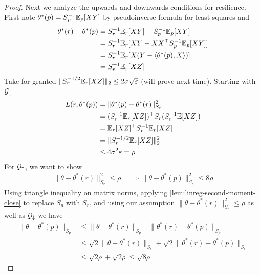 \begin{proof}
  Next we analyze the upwards and downwards conditions for resilience.
  First note $\theta^*(p) = S_p^{-1} \mathbb{E}_p[ X Y]$ by pseudoinverse formula
  for least squares and
  \begin{align}
    \theta^*(r) - \theta^*(p)
    &= S_r^{-1} \mathbb{E}_r[X Y] - S_p^{-1} \mathbb{E}_p[ X Y] \\
    &= S_r^{-1} \mathbb{E}_r[X Y - X X^\top S_p^{-1} \mathbb{E}_p[X Y]] \\
    &= S_r^{-1} \mathbb{E}_r[X (Y - \braket{\theta^*(p), X})] \\
    &= S_r^{-1} \mathbb{E}_r[X Z] \label{eq:linreg-second-moment-diff-theta-star}
  \end{align}
  Take for granted $\| S_r^{-1/2} \mathbb{E}_r[X Z]\|_2 \leq 2 \sigma \sqrt{\varepsilon}$
  (will prove next time).
  Starting with $\mathcal{G}_{\downarrow}$
  \begin{align}
    L(r, \theta^*(p))
    &= \|\theta^*(p) - \theta^*(r)\|_{S_r}^2 \\
    &= (S_r^{-1} \mathbb{E}_r[X Z])^\top S_r (S_r^{-1} \mathbb{E}[X Z]) \\
    &=  \mathbb{E}_r[X Z]^\top S_r^{-1} \mathbb{E}_r[X Z] \\
    &= \|S_r^{-1/2} \mathbb{E}_r[X Z]\|_2^2 \\
    &\leq 4 \sigma^2 \varepsilon = \rho
  \end{align}
  For $\mathcal{G}_{\uparrow}$, we want to show
  \begin{align}
    \|\theta - \theta^*(r)\|^2_{S_r}
    \leq \rho
    &\implies \|\theta - \theta^*(p)\|^2_{S_p} \leq 8 \rho
  \end{align}
  Using triangle inequality on matrix norms,
  applying \cref{lem:linreg-second-moment-close} to replace $S_p$ with $S_r$,
  and using our assumption $\|\theta - \theta^*(r)\|_{S_r}^2 \leq \rho$
  as well as $\mathcal{G}_\downarrow$ we have
  \begin{align}
    \|\theta - \theta^*(p)\|_{S_p}
    &\leq \|\theta - \theta^*(r)\|_{S_p}
    + \|\theta^*(r) - \theta^*(p)\|_{S_p} \\
    &\leq \sqrt{2} \|\theta - \theta^*(r)\|_{S_r}
    + \sqrt{2} \|\theta^*(r) - \theta^*(p)\|_{S_r} \\
    &\leq \sqrt{2 \rho}
    + \sqrt{2 \rho}
    \leq \sqrt{8 \rho}
  \end{align}
\end{proof}
